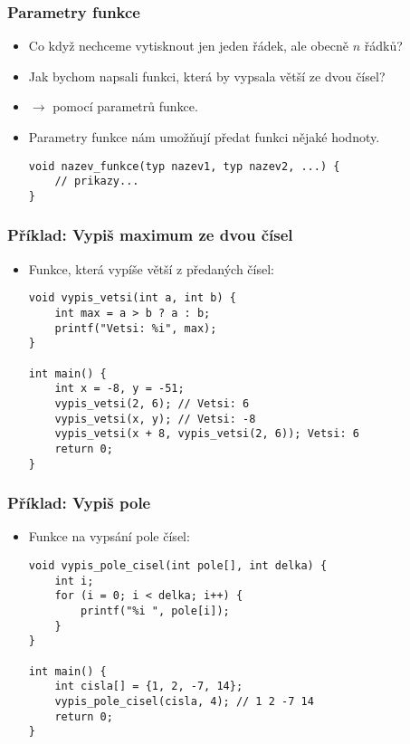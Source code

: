 \documentclass{beamer}
\newenvironment{itemizex}%
  {\large \begin{itemize}%
    \setlength{\itemsep}{8pt}%
    \setlength{\parskip}{8pt}}%
  {\end{itemize}}
\begin{document}
\begin{frame}[t,fragile]\frametitle{Parametry funkce} 
    \begin{itemizex}
        \item Co když nechceme vytisknout jen jeden řádek, ale obecně $n$ řádků?
        \item Jak bychom napsali funkci, která by vypsala větší ze dvou čísel? 
        \item $\longrightarrow$ pomocí parametrů funkce.
        \item Parametry funkce nám umožňují předat funkci nějaké hodnoty.
        \begin{verbatim} 
void nazev_funkce(typ nazev1, typ nazev2, ...) { 
    // prikazy... 
}
        \end{verbatim}
    \end{itemizex}
\end{frame}



\begin{frame}[t,fragile]\frametitle{Příklad: Vypiš maximum ze dvou čísel} 
    \begin{itemizex}
        \item Funkce, která vypíše větší z předaných čísel:
        \begin{verbatim} 
void vypis_vetsi(int a, int b) {
    int max = a > b ? a : b;
    printf("Vetsi: %i", max);
}

int main() {
    int x = -8, y = -51;
    vypis_vetsi(2, 6); // Vetsi: 6
    vypis_vetsi(x, y); // Vetsi: -8
    vypis_vetsi(x + 8, vypis_vetsi(2, 6)); Vetsi: 6
    return 0;
}
        \end{verbatim}
    \end{itemizex}
\end{frame}


\begin{frame}[t,fragile]\frametitle{Příklad: Vypiš pole} 
    \begin{itemizex}
        \item Funkce na vypsání pole čísel:
        \begin{verbatim} 
void vypis_pole_cisel(int pole[], int delka) {
    int i;
    for (i = 0; i < delka; i++) {
        printf("%i ", pole[i]);
    }
}

int main() {
    int cisla[] = {1, 2, -7, 14};
    vypis_pole_cisel(cisla, 4); // 1 2 -7 14 
    return 0;
}
        \end{verbatim}
    \end{itemizex}
\end{frame}
\end{document}
